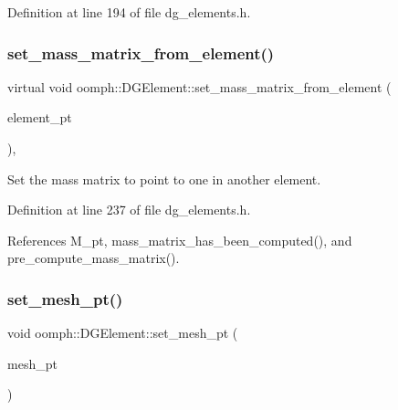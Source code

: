 Definition at line 194 of file dg\+\_\+elements.\+h.

\mbox{\label{classoomph_1_1DGElement_a794df81f734bdab309fe76a713588524}} 
\subsubsection{\texorpdfstring{set\+\_\+mass\+\_\+matrix\+\_\+from\+\_\+element()}{set\_mass\_matrix\_from\_element()}}
{\footnotesize\ttfamily virtual void oomph\+::\+D\+G\+Element\+::set\+\_\+mass\+\_\+matrix\+\_\+from\+\_\+element (\begin{DoxyParamCaption}\item[{\hyperlink{classoomph_1_1DGElement}{D\+G\+Element} $\ast$const \&}]{element\+\_\+pt }\end{DoxyParamCaption})\hspace{0.3cm}{\ttfamily [inline]}, {\ttfamily [virtual]}}



Set the mass matrix to point to one in another element. 



Definition at line 237 of file dg\+\_\+elements.\+h.



References M\+\_\+pt, mass\+\_\+matrix\+\_\+has\+\_\+been\+\_\+computed(), and pre\+\_\+compute\+\_\+mass\+\_\+matrix().

\mbox{\label{classoomph_1_1DGElement_a8908504165b2d6bd3e2429a08160fd2b}} 
\subsubsection{\texorpdfstring{set\+\_\+mesh\+\_\+pt()}{set\_mesh\_pt()}}
{\footnotesize\ttfamily void oomph\+::\+D\+G\+Element\+::set\+\_\+mesh\+\_\+pt (\begin{DoxyParamCaption}\item[{\hyperlink{classoomph_1_1DGMesh}{D\+G\+Mesh} $\ast$\&}]{mesh\+\_\+pt }\end{DoxyParamCaption})\hspace{0.3cm}{\ttfamily [inline]}}



